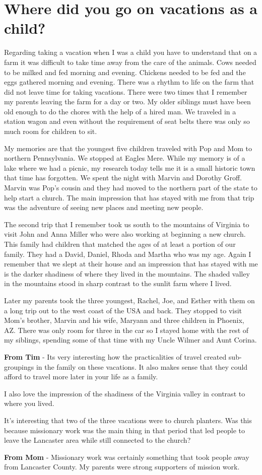 \section{Where did you go on vacations as a child?}
Regarding taking a vacation when I was a child you have to understand that on a farm it was difficult to take time away from the care of the animals.
Cows needed to be milked and fed morning and evening.
Chickens needed to be fed and the eggs gathered morning and evening.
There was a rhythm to life on the farm that did not leave time for taking vacations.
There were two times that I remember my parents leaving the farm for a day or two.
My older siblings must have been old enough to do the chores with the help of a hired man.
We traveled in a station wagon and even without the requirement of seat belts there was only so much room for children to sit.

My memories are that the youngest five children traveled with Pop and Mom to northern Pennsylvania.
We stopped at Eagles Mere.
While my memory is of a lake where we had a picnic, my research today tells me it is a small historic town that time has forgotten.
We spent the night with Marvin and Dorothy Groff.
Marvin was Pop's cousin and they had moved to the northern part of the state to help start a church.
The main impression that has stayed with me from that trip was the adventure of seeing new places and meeting new people.

The second trip that I remember took us south to the mountains of Virginia to visit John and Anna Miller who were also working at beginning a new church.
This family had children that matched the ages of at least a portion of our family.
They had a David, Daniel, Rhoda and Martha who was my age.
Again I remember that we slept at their house and an impression that has stayed with me is the darker shadiness of where they lived in the mountains.
The shaded valley in the mountains stood in sharp contrast to the sunlit farm where I lived.

Later my parents took the three youngest, Rachel, Joe, and Esther with them on a long trip out to the west coast of the USA and back.
They stopped to visit Mom's brother, Marvin and his wife, Maryann and three children in Phoenix, AZ.
There was only room for three in the car so I stayed home with the rest of my siblings, spending some of that time with my Uncle Wilmer and Aunt Corina.

\textbf{From Tim} - Its very interesting how the practicalities of travel created sub-groupings in the family on these vacations.
It also makes sense that they could afford to travel more later in your life as a family.

I also love the impression of the shadiness of the Virginia valley in contrast to where you lived.

It's interesting that two of the three vacations were to church planters.
Was this because missionary work was the main thing in that period that led people to leave the Lancaster area while still connected to the church?

\textbf{From Mom} - Missionary work was certainly something that took people away from Lancaster County.
My parents were strong supporters of mission work.
